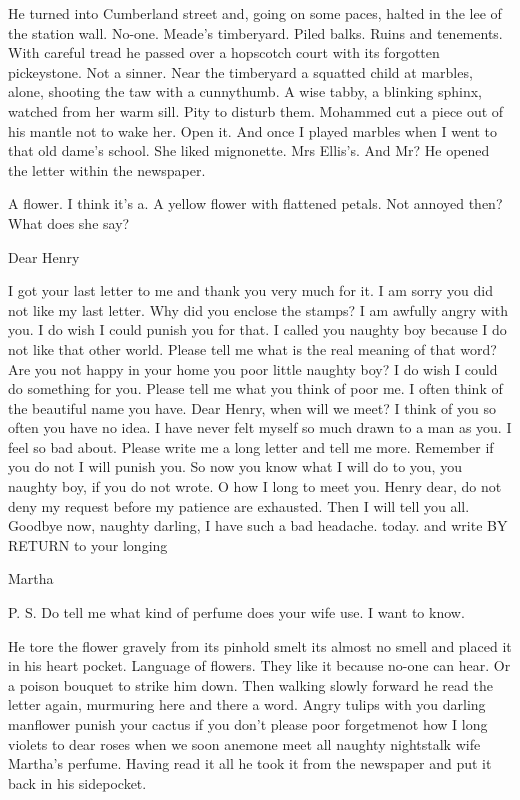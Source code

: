 He turned into Cumberland street and, going on some paces, halted
in the lee of the station wall. No-one. Meade's timberyard. Piled balks.
Ruins and tenements. With careful tread he passed over a hopscotch court
with its forgotten pickeystone. Not a sinner. Near the timberyard a
squatted child at marbles, alone, shooting the taw with a cunnythumb. A
wise tabby, a blinking sphinx, watched from her warm sill. Pity to disturb
them. Mohammed cut a piece out of his mantle not to wake her. Open it.
And once I played marbles when I went to that old dame's school. She liked
mignonette. Mrs Ellis's. And Mr? He opened the letter within the
newspaper.

A flower. I think it's a. A yellow flower with flattened petals. Not
annoyed then? What does she say?


    Dear Henry

I got your last letter to me and thank you very much for it. I am sorry
you did not like my last letter. Why did you enclose the stamps? I am
awfully angry with you. I do wish I could punish you for that. I called
you naughty boy because I do not like that other world. Please tell me
what is the real meaning of that word? Are you not happy in your home you
poor little naughty boy? I do wish I could do something for you. Please
tell me what you think of poor me. I often think of the beautiful name you
have. Dear Henry, when will we meet? I think of you so often you have no
idea. I have never felt myself so much drawn to a man as you. I feel so
bad about. Please write me a long letter and tell me more. Remember if you
do not I will punish you. So now you know what I will do to you, you
naughty boy, if you do not wrote. O how I long to meet you. Henry dear, do
not deny my request before my patience are exhausted. Then I will tell you
all. Goodbye now, naughty darling, I have such a bad headache. today. and
write BY RETURN to your longing


    Martha

P. S. Do tell me what kind of perfume does your wife use. I want to know.


He tore the flower gravely from its pinhold smelt its almost no smell
and placed it in his heart pocket. Language of flowers. They like it
because no-one can hear. Or a poison bouquet to strike him down. Then
walking slowly forward he read the letter again, murmuring here and there
a word. Angry tulips with you darling manflower punish your cactus if you
don't please poor forgetmenot how I long violets to dear roses when we
soon anemone meet all naughty nightstalk wife Martha's perfume. Having
read it all he took it from the newspaper and put it back in his
sidepocket.


